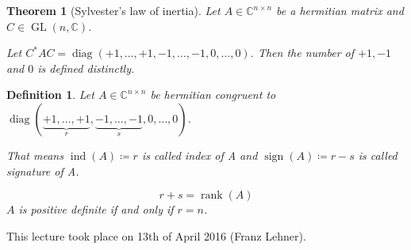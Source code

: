 \documentclass[a4paper,landscape,twocolumn]{article}
\newcommand\meta[3]{This #1 took place on #2 (#3).\par}
\newtheorem{theorem}{Theorem}
\newtheorem{defi}{Definition}
\begin{document}
\begin{theorem}[Sylvester's law of inertia]
  Let $A \in \mathbb C^{n\times n}$ be a hermitian matrix and $C \in \operatorname{GL}(n, \mathbb C)$.

  Let $C^* AC = \operatorname{diag}(+1, \ldots, +1, -1, \ldots, -1, 0, \ldots, 0)$.
  Then the number of $+1, -1$ and $0$ is defined distinctly.
\end{theorem}

\begin{defi}
  \label{defi-8.28}
  Let $A \in \mathbb C^{n \times n}$ be hermitian
  congruent to $\operatorname{diag}(\underbrace{+1, \ldots, +1}_{r}, \underbrace{-1, \ldots, -1}_{s}, 0, \ldots, 0)$.

  That means $\operatorname{ind}(A) \coloneqq r$ is called \emph{index of A}
  and $\operatorname{sign}(A) \coloneqq r - s$ is called \emph{signature of A}.

  \[ r + s = \operatorname{rank}(A) \]
  $A$ is positive definite if and only if $r = n$.
\end{defi}

\meta{lecture}{13th of April 2016}{Franz Lehner}
\end{document}
